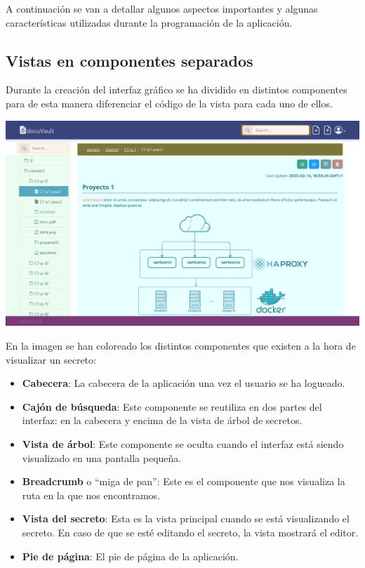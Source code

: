 \documentclass{\ClassPath/viu-tfm-template}
\begin{document}
A continuación se van a detallar algunos aspectos importantes y algunas características utilizadas durante la programación de la aplicación.


\subsection{Vistas en componentes separados}

Durante la creación del interfaz gráfico se ha dividido en distintos componentes para de esta manera diferenciar el código de la vista para cada uno de ellos.

\begin{center}
    \includegraphics[frame,width=\linewidth]{img/interfaz2-colored.png}
\end{center}

En la imagen se han coloreado los distintos componentes que existen a la hora de visualizar un secreto:

\begin{itemize}
    \item \textbf{Cabecera}: La cabecera de la aplicación una vez el usuario se ha logueado.
    \item \textbf{Cajón de búsqueda}: Este componente se reutiliza en dos partes del interfaz: en la cabecera y encima de la vista de árbol de secretos.
    \item \textbf{Vista de árbol}: Este componente se oculta cuando el interfaz está siendo visualizado en una pantalla pequeña.
    \item \textbf{Breadcrumb} o “miga de pan”: Este es el componente que nos visualiza la ruta en la que nos encontramos.
    \item \textbf{Vista del secreto}: Esta es la vista principal cuando se está visualizando el secreto. En caso de que se esté editando el secreto, la vista mostrará el editor.
    \item \textbf{Pie de página}: El pie de página de la aplicación.
\end{itemize}
\end{document}
